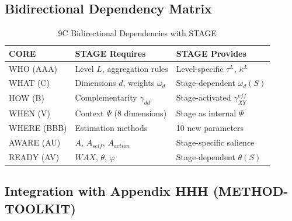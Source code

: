 \subsection{Bidirectional Dependency Matrix}

\begin{table}[htbp]
\centering
\caption{9C Bidirectional Dependencies with STAGE}
\label{tab:8c-dependencies}
\renewcommand{\arraystretch}{1.3}
\footnotesize
\begin{tabular}{@{}lp{4.5cm}p{4.5cm}@{}}
\toprule
\textbf{CORE} & \textbf{STAGE Requires} & \textbf{STAGE Provides} \\
\midrule
WHO (AAA) & Level $L$, aggregation rules & Level-specific $\tau^L$, $\kappa^L$ \\
WHAT (C) & Dimensions $d$, weights $\omega_d$ & Stage-dependent $\omega_d(S)$ \\
HOW (B) & Complementarity $\gamma_{dd'}$ & Stage-activated $\gamma_{XY}^{eff}$ \\
WHEN (V) & Context $\Psi$ (8 dimensions) & Stage as internal $\Psi$ \\
WHERE (BBB) & Estimation methods & 10 new parameters \\
AWARE (AU) & $A$, $A_{self}$, $A_{action}$ & Stage-specific salience \\
READY (AV) & $WAX$, $\theta$, $\varphi$ & Stage-dependent $\theta(S)$ \\
\bottomrule
\end{tabular}
\end{table}

\subsection{Integration with Appendix HHH (METHOD-TOOLKIT)}
\label{sec:aw-hhh-integration}

